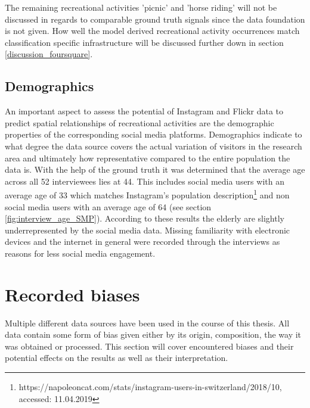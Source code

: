 The remaining recreational activities 'picnic' and 'horse riding' will not be discussed in regards to comparable ground truth signals since the data foundation is not given. How well the model derived recreational activity occurrences match classification specific infrastructure will be discussed further down in section \ref{discussion_foursquare}.\\

\subsection{Demographics}
An important aspect to assess the potential of Instagram and Flickr data to predict spatial relationships of recreational activities are the demographic properties of the corresponding social media platforms. Demographics indicate to what degree the data source covers the actual variation of visitors in the research area and ultimately how representative compared to the entire population the data is. With the help of the ground truth it was determined that the average age across all 52 interviewees lies at 44. This includes social media users with an average age of 33 which matches Instagram's population description\footnote{https://napoleoncat.com/stats/instagram-users-in-switzerland/2018/10, accessed: 11.04.2019} and non social media users with an average age of 64 (see section \ref{fig:interview_age_SMP}). According to these results the elderly are slightly underrepresented by the social media data. Missing familiarity with electronic devices and the internet in general were recorded through the interviews as reasons for less social media engagement. 

\section{Recorded biases} \label{discussion_rec_bias}
Multiple different data sources have been used in the course of this thesis. All data contain some form of bias given either by its origin, composition, the way it was obtained or processed. 
This section will cover encountered biases and their potential effects on the results as well as their interpretation.

